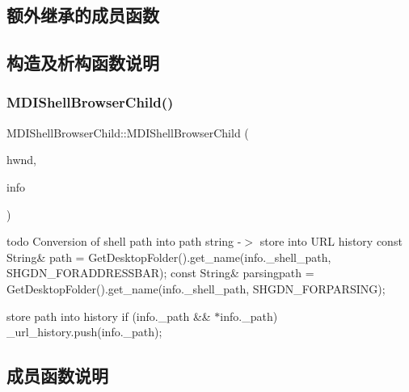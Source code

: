 \subsection*{额外继承的成员函数}


\subsection{构造及析构函数说明}
\mbox{\label{struct_m_d_i_shell_browser_child_a807757636a4879dbb770868ba669d434}} 
\subsubsection{\texorpdfstring{M\+D\+I\+Shell\+Browser\+Child()}{MDIShellBrowserChild()}}
{\footnotesize\ttfamily M\+D\+I\+Shell\+Browser\+Child\+::\+M\+D\+I\+Shell\+Browser\+Child (\begin{DoxyParamCaption}\item[{\hyperlink{interfacevoid}{H\+W\+ND}}]{hwnd,  }\item[{const \hyperlink{struct_shell_child_wnd_info}{Shell\+Child\+Wnd\+Info} \&}]{info }\end{DoxyParamCaption})}

todo Conversion of shell path into path string -\/$>$ store into U\+RL history const String\& path = Get\+Desktop\+Folder().get\+\_\+name(info.\+\_\+shell\+\_\+path, S\+H\+G\+D\+N\+\_\+\+F\+O\+R\+A\+D\+D\+R\+E\+S\+S\+B\+AR); const String\& parsingpath = Get\+Desktop\+Folder().get\+\_\+name(info.\+\_\+shell\+\_\+path, S\+H\+G\+D\+N\+\_\+\+F\+O\+R\+P\+A\+R\+S\+I\+NG);

store path into history if (info.\+\_\+path \&\& $\ast$info.\+\_\+path) \+\_\+url\+\_\+history.\+push(info.\+\_\+path);

\subsection{成员函数说明}
\mbox{\label{struct_m_d_i_shell_browser_child_af95b24955890eb76e84227629c886329}} 
